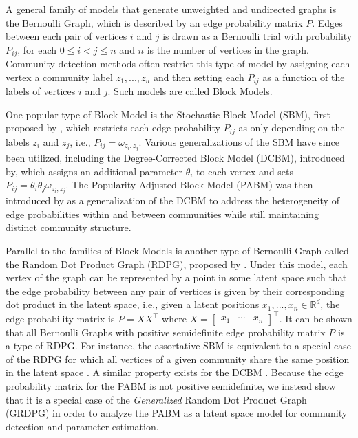 \documentclass[12pt]{article}
\begin{document}
A general family of models that generate unweighted and undirected graphs is the Bernoulli Graph, which is described by an edge probability matrix $P$. Edges between each pair of vertices $i$ and $j$ is drawn as a Bernoulli trial with probability $P_{ij}$, for each $0 \leq i < j \leq n$ and $n$ is the number of vertices in the graph. Community detection methods often restrict this type of model by assigning each vertex a community label $z_1, ..., z_n$ and then setting each $P_{ij}$ as a function of the labels of vertices $i$ and $j$. Such models are called Block Models. 

One popular type of Block Model is the Stochastic Block Model (SBM),
first proposed by \citet{doi:10.1080/0022250X.1971.9989788}, 
which restricts each edge probability $P_{ij}$ as only depending on the labels 
$z_i$ and $z_j$, i.e., $P_{ij} = \omega_{z_i, z_j}$. 
Various generalizations of the SBM have since been utilized, 
including the Degree-Corrected Block Model (DCBM), 
introduced by\citet{Karrer_2011}, 
which assigns an additional parameter $\theta_i$ to each vertex 
and sets $P_{ij} = \theta_i \theta_j \omega_{z_i, z_j}$. 
The Popularity Adjusted Block Model (PABM) was then introduced by
\citet*{307cbeb9b1be48299388437423d94bf1} as a generalization of the
DCBM to address the heterogeneity of edge probabilities within and
between communities while still maintaining distinct community
structure.

Parallel to the families of Block Models is another type of Bernoulli Graph 
called the Random Dot Product Graph (RDPG), proposed by
\citet*{10.1007/978-3-540-77004-6_11}. Under this model, each vertex of the graph
can be represented by a point in some latent space such that the edge
probability between any pair of vertices is given by their corresponding
dot product in the latent space, i.e., given a latent positions
\(x_1, ..., x_n \in \mathbb{R}^d\), the edge probability matrix is
\(P = X X^\top\) where 
\(X = \begin{bmatrix} x_1 & \cdots & x_n \end{bmatrix}^\top\). 
It can be shown that all Bernoulli Graphs with 
positive semidefinite edge probability matrix $P$ is a type of RDPG. 
For instance, the assortative
SBM is equivalent to a special case of the RDPG for which all vertices
of a given community share the same position in the latent space
\cite{lyzinski2014}. A similar property exists for the DCBM
\cite{lyzinski2014, rubindelanchy2017consistency}. 
Because the edge probability matrix for the PABM is not positive semidefinite, 
we instead show that it is a special case of the \emph{Generalized} Random Dot Product Graph (GRDPG) in order to analyze the PABM as a latent space model for community detection and parameter estimation. 
\end{document}
